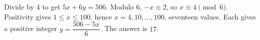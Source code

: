 Divide by 4 to get $5x+6y=506$. Modulo 6, $-x\equiv2$, so $x\equiv4\pmod6$. Positivity gives $1\le x\le100$, hence $x=4,10,\ldots,100$, seventeen values. Each gives a positive integer $y=\dfrac{506-5x}{6}$. The answer is $\boxed{17}$.
